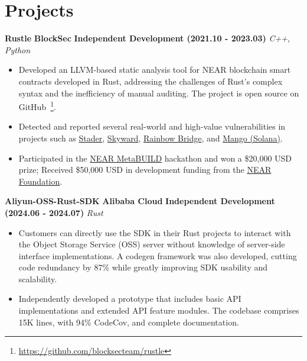 \ifdefined\english

    \section*{Projects}

    \noindent \textbf{Rustle} \textbar{} \textbf{BlockSec} \textbar{} \textbf{Independent Development (2021.10 -
    2023.03)} \hfill \textsl{C++, Python}

    \begin{itemize}
        \item Developed an LLVM-based static analysis tool for NEAR blockchain smart contracts developed in Rust,
              addressing the challenges of Rust's complex syntax and the inefficiency of manual auditing. The project
              is open source on GitHub~\footnote{\url{https://github.com/blocksecteam/rustle}}.
        \item Detected and reported several real-world and high-value vulnerabilities in projects such as
              \href{https://blog.staderlabs.com/stader-near-incident-report-08-16-2022-afe077ffd549}{Stader},
              \href{https://coinculture.com/au/business/skyward-finance-reportedly-suffers-3m-exploit-on-near-protocol/}{Skyward},
              \href{https://cryptopotato.com/defi-crisis-averted-near-protocols-rainbow-bridge-attacker-loses-2-5-eth/}{Rainbow
              Bridge}, and
              \href{https://blog.perp.fi/dissecting-the-mango-exploit-how-risk-is-mitigated-on-perp-v2-eccc91987c91}{Mango
              (Solana)}.
        \item Participated in the \href{https://devpost.com/software/rustle}{NEAR MetaBUILD} hackathon and won a
              \$20,000 USD prize; Received \$50,000 USD in development funding from the
              \href{https://near.foundation}{NEAR Foundation}.
    \end{itemize}

    \noindent \textbf{Aliyun-OSS-Rust-SDK} \textbar{} \textbf{Alibaba Cloud} \textbar{} \textbf{Independent Development
    (2024.06 - 2024.07)} \hfill \textsl{Rust}

    \begin{itemize}
        \item Customers can directly use the SDK in their Rust projects to interact with the Object Storage Service
              (OSS) server without knowledge of server-side interface implementations. A codegen framework was also
              developed, cutting code redundancy by 87\% while greatly improving SDK usability and scalability.
        \item Independently developed a prototype that includes basic API implementations and extended API feature
              modules. The codebase comprises 15K lines, with 94\% CodeCov, and complete documentation.
    \end{itemize}

